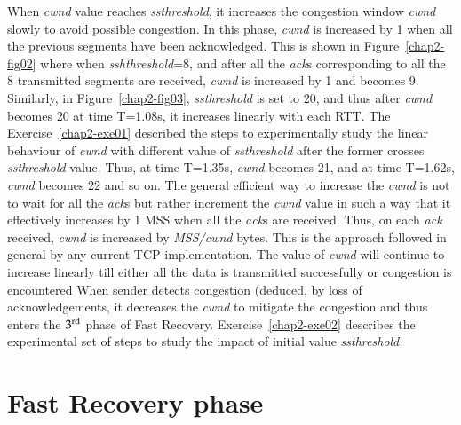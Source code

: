 \begin{multicols}{2}
When \textit{cwnd} value reaches \textit{ssthreshold}, it increases the congestion window \textit{cwnd} slowly to avoid possible congestion. In this phase, \textit{cwnd} is increased by 1 when all the previous segments have been acknowledged. This is shown in Figure~\ref{chap2-fig02}  where when \textit{sshthreshold}=8, and after all the \textit{ack}s corresponding to all the 8 transmitted segments are received, \textit{cwnd} is increased by 1 and becomes 9. Similarly, in Figure~\ref{chap2-fig03}, \textit{ssthreshold} is set to 20, and thus after \textit{cwnd} becomes 20 at time T=1.08s, it increases linearly with each RTT. The Exercise~\ref{chap2-exe01} described the steps to experimentally study the linear behaviour of \textit{cwnd} with different value of \textit{ssthreshold} after the former crosses \textit{ssthreshold} value. Thus, at time T=1.35s, \textit{cwnd} becomes 21, and at time T=1.62s, \textit{cwnd} becomes 22 and so on. The general efficient way to increase the \textit{cwnd} is not to wait for all the \textit{ack}s but rather increment the \textit{cwnd} value in such a way that it effectively increases by 1 MSS when all the \textit{ack}s are received. Thus, on each \textit{ack} received, \textit{cwnd} is increased by \textit{MSS/cwnd} bytes. This is the approach followed in general by any current TCP implementation. The value of \textit{cwnd} will continue to increase linearly till either all the data is transmitted successfully or congestion is encountered When sender detects congestion (deduced, by loss of acknowledgements, it decreases the \textit{cwnd} to mitigate the congestion and thus enters the ${\rm 3}^{\text {rd}}$ phase of Fast Recovery. Exercise~\ref{chap2-exe02} describes the experimental set of steps to study the impact of initial value \textit{ssthreshold.}

\section{Fast Recovery phase}


\end{multicols}
